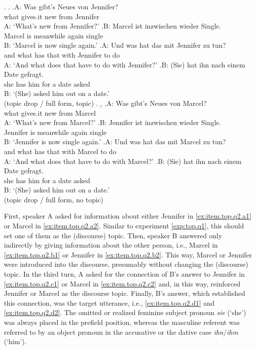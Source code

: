 \ex.\label{ex:item.top.q2}
\a.
\ag.A: Was gibt's Neues von Jennifer?\label{ex:item.top.q2.a1}\\
{} what gives.it new from Jennifer\\
A: `What's new from Jennifer?'
\bg.\label{ex:item.top.q2.b1}B: Marcel ist inzwischen wieder Single.\\
{} Marcel is meanwhile again single\\
B: `Marcel is now single again.'
\cg.\label{ex:item.top.q2.c1}A: Und was hat das mit Jennifer zu tun?\\
{} and what has that with Jennifer to do\\
A: `And what does that have to do with Jennifer?'
\dg.\label{ex:item.top.q2.d1}B: (Sie) hat ihn nach einem Date gefragt.\\
{} she has him for a date asked\\
B: `(She) asked him out on a date.'\\\phantom{.}\hfill(topic drop / full form, topic)
\z.
\b.
\ag.A: Was gibt's Neues von Marcel?\label{ex:item.top.q2.a2}\\
{} what gives.it new from Marcel\\
A: `What's new from Marcel?'
\bg.\label{ex:item.top.q2.b2}B: Jennifer ist inzwischen wieder Single.\\
{} Jennifer is meanwhile again single\\
B: `Jennifer is now single again.'
\cg.\label{ex:item.top.q2.c2}A: Und was hat das mit Marcel zu tun?\\
{} and what has that with Marcel to do\\
A: `And what does that have to do with Marcel?'
\dg.\label{ex:item.top.q2.d2}B: (Sie) hat ihn nach einem Date gefragt.\\
{} she has him for a date asked\\
B: `(She) asked him out on a date.'\\\phantom{.}\hfill(topic drop / full form, no topic)

First, speaker A asked for information about either Jennifer in \ref{ex:item.top.q2.a1} or Marcel in \ref{ex:item.top.q2.a2}. 
Similar to experiment \ref*{exp:top.q1}, this should set one of them as the (discourse) topic.
Then, speaker B answered only indirectly by giving information about the other person, i.e., Marcel in \ref{ex:item.top.q2.b1} or Jennifer in \ref{ex:item.top.q2.b2}.
This way, Marcel or Jennifer were introduced into the discourse, presumably without changing the (discourse) topic.
In the third turn, A asked for the connection of B's answer to Jennifer in \ref{ex:item.top.q2.c1} or Marcel in \ref{ex:item.top.q2.c2} and, in this way, reinforced Jennifer or Marcel as the discourse topic. 
Finally, B's answer, which established this connection, was the target utterance, i.e., \ref{ex:item.top.q2.d1} and \ref{ex:item.top.q2.d2}.
The omitted or realized feminine subject pronoun \textit{sie} (`she') was always placed in the prefield position, whereas the masculine referent was referred to by an object pronoun in the accusative or the dative case \textit{ihn}/\textit{ihm} (`him').

